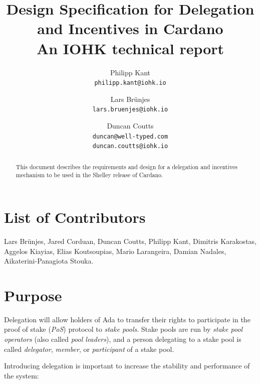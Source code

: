 \documentclass[11pt,a4paper]{article}
\begin{document}
\title{Design Specification for Delegation and Incentives in Cardano \\
       {\large \sc An IOHK technical report}}

\author{Philipp Kant   \\ {\small \texttt{philipp.kant@iohk.io}} \\
   \and Lars Br\"unjes \\ {\small \texttt{lars.bruenjes@iohk.io}} \\
   \and Duncan Coutts  \\ {\small \texttt{duncan@well-typed.com}} \\
                          {\small \texttt{duncan.coutts@iohk.io}}}
\maketitle

\begin{abstract}
This document describes the requirements and design for a delegation and
incentives mechanism to be used in the Shelley release of Cardano.
\end{abstract}

\section*{List of Contributors}
\label{acknowledgements}

Lars Br\"unjes, Jared Corduan, Duncan Coutts, Philipp Kant,
Dimitris Karakostas, Aggelos Kiayias, Elias Koutsoupias, Mario
Larangeira, Damian Nadales, Aikaterini-Panagiota Stouka.

\tableofcontents
\listoffigures
\listoftodos

\section{Purpose}
\label{purpose}

Delegation will allow holders of Ada to transfer their rights to
participate in the proof of stake (\emph{PoS}) protocol to \emph{stake
pools}. Stake pools are run by \emph{stake pool operators} (also called
\emph{pool leaders}), and a person delegating to a stake pool is called
\emph{delegator}, \emph{member}, or \emph{participant} of a stake pool.

Introducing delegation is important to increase the stability and
performance of the system:
\end{document}
